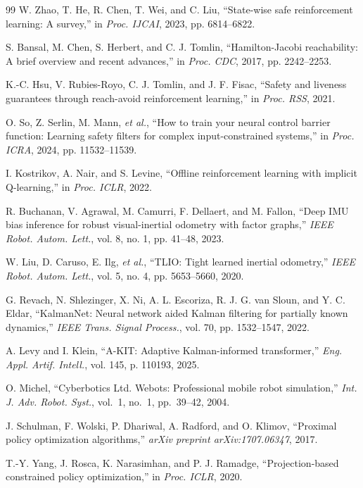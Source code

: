 \documentclass[letterpaper, 10 pt, conference]{ieeeconf}
\begin{document}
\begin{thebibliography}{99}
W. Zhao, T. He, R. Chen, T. Wei, and C. Liu, ``State-wise safe reinforcement learning: A survey,'' in \emph{Proc. IJCAI}, 2023, pp. 6814--6822.

S. Bansal, M. Chen, S. Herbert, and C. J. Tomlin, ``Hamilton-Jacobi reachability: A brief overview and recent advances,'' in \emph{Proc. CDC}, 2017, pp. 2242--2253.

K.-C. Hsu, V. Rubies-Royo, C. J. Tomlin, and J. F. Fisac, ``Safety and liveness guarantees through reach-avoid reinforcement learning,'' in \emph{Proc. RSS}, 2021.

O. So, Z. Serlin, M. Mann, \emph{et al.}, ``How to train your neural control barrier function: Learning safety filters for complex input-constrained systems,'' in \emph{Proc. ICRA}, 2024, pp. 11532--11539.

I. Kostrikov, A. Nair, and S. Levine, ``Offline reinforcement learning with implicit Q-learning,'' in \emph{Proc. ICLR}, 2022.

R. Buchanan, V. Agrawal, M. Camurri, F. Dellaert, and M. Fallon, ``Deep IMU bias inference for robust visual-inertial odometry with factor graphs,'' \emph{IEEE Robot. Autom. Lett.}, vol. 8, no. 1, pp. 41--48, 2023.

W. Liu, D. Caruso, E. Ilg, \emph{et al.}, ``TLIO: Tight learned inertial odometry,'' \emph{IEEE Robot. Autom. Lett.}, vol. 5, no. 4, pp. 5653--5660, 2020.

G. Revach, N. Shlezinger, X. Ni, A. L. Escoriza, R. J. G. van Sloun, and Y. C. Eldar, ``KalmanNet: Neural network aided Kalman filtering for partially known dynamics,'' \emph{IEEE Trans. Signal Process.}, vol. 70, pp. 1532--1547, 2022.

A. Levy and I. Klein, ``A-KIT: Adaptive Kalman-informed transformer,'' \emph{Eng. Appl. Artif. Intell.}, vol. 145, p. 110193, 2025.

O. Michel, ``Cyberbotics Ltd. Webots: Professional mobile robot simulation,'' \emph{Int. J. Adv. Robot. Syst.}, vol.~1, no.~1, pp.~39--42, 2004.

J. Schulman, F. Wolski, P. Dhariwal, A. Radford, and O. Klimov, ``Proximal policy optimization algorithms,'' \emph{arXiv preprint arXiv:1707.06347}, 2017.

T.-Y. Yang, J. Rosca, K. Narasimhan, and P. J. Ramadge, ``Projection-based constrained policy optimization,'' in \emph{Proc. ICLR}, 2020.


\end{thebibliography}
\end{document}
